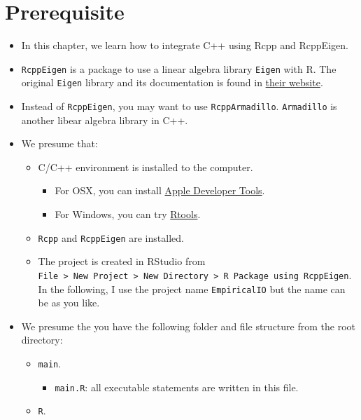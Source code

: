 \documentclass[]{book}
\providecommand{\tightlist}{%
  \setlength{\itemsep}{0pt}\setlength{\parskip}{0pt}}
\begin{document}
\section{Prerequisite}\label{prerequisite}

\begin{itemize}
\item
  In this chapter, we learn how to integrate C++ using Rcpp and
  RcppEigen.
\item
  \texttt{RcppEigen} is a package to use a linear algebra library
  \texttt{Eigen} with R. The original \texttt{Eigen} library and its
  documentation is found in
  \href{http://eigen.tuxfamily.org/index.php?title=Main_Page}{their
  website}.
\item
  Instead of \texttt{RcppEigen}, you may want to use
  \texttt{RcppArmadillo}. \texttt{Armadillo} is another libear algebra
  library in C++.
\item
  We presume that:

  \begin{itemize}
  \tightlist
  \item
    C/C++ environment is installed to the computer.

    \begin{itemize}
    \tightlist
    \item
      For OSX, you can install
      \href{https://developer.apple.com/xcode/}{Apple Developer Tools}.
    \item
      For Windows, you can try
      \href{https://cran.r-project.org/bin/windows/Rtools/}{Rtools}.
    \end{itemize}
  \item
    \texttt{Rcpp} and \texttt{RcppEigen} are installed.
  \item
    The project is created in RStudio from
    \texttt{File\ \textgreater{}\ New\ Project\ \textgreater{}\ New\ Directory\ \textgreater{}\ R\ Package\ using\ RcppEigen}.
    In the following, I use the project name \texttt{EmpiricalIO} but
    the name can be as you like.
  \end{itemize}
\item
  We presume the you have the following folder and file structure from
  the root directory:

  \begin{itemize}
  \tightlist
  \item
    \texttt{main}.

    \begin{itemize}
    \tightlist
    \item
      \texttt{main.R}: all executable statements are written in this
      file.
    \end{itemize}
  \item
    \texttt{R}.


\end{itemize}
\end{itemize}
\end{document}
